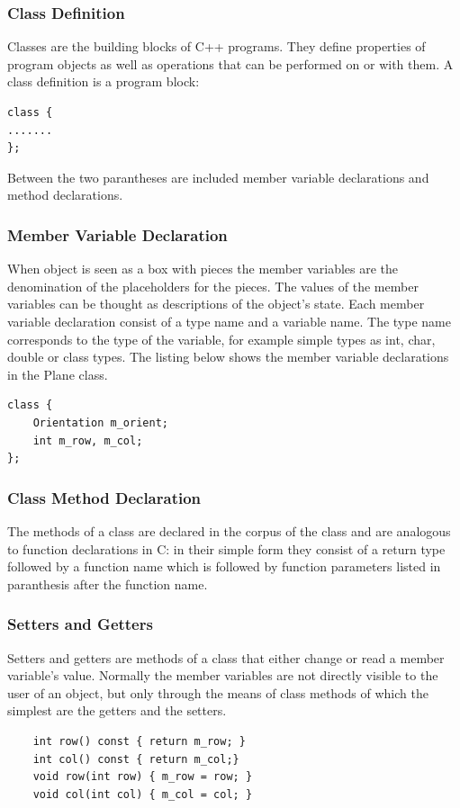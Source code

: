 \subsubsection {Class Definition}
Classes are the building blocks of C++ programs. They define properties of program objects as well as operations that can be performed on or with them. A class definition is a program block:
\begin{lstlisting}
class {
.......
};
\end{lstlisting}
Between the two parantheses  are included member variable declarations and method declarations. 

\subsubsection {Member Variable Declaration}
When object is seen as a box with pieces the member variables are the denomination of the placeholders for the pieces. The values of the member variables can be thought as descriptions of the object's state. Each member variable declaration consist of a type name and a variable name. The type name corresponds to the type of the variable, for example simple types as int, char, double or class types.
The listing below shows the member variable declarations in the Plane class.
\begin{lstlisting}
class {
    Orientation m_orient;
    int m_row, m_col;
};
\end{lstlisting}

\subsubsection {Class Method Declaration}
The methods of a class are declared in the corpus of the class and are analogous to function declarations in C: in their simple form they consist of a return type followed by a function name which is followed by function parameters listed in paranthesis after the function name.

\subsubsection {Setters and Getters}
Setters and getters are methods of a class that either change or read a member variable's value. Normally the member variables are not directly visible to the user of an object, but only through the means of class methods of which the simplest are the getters and the setters.
\begin{lstlisting}
    int row() const { return m_row; }
    int col() const { return m_col;}
    void row(int row) { m_row = row; }
    void col(int col) { m_col = col; }
\end{lstlisting}

